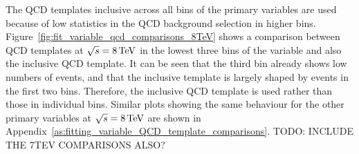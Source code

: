 \FloatBarrier

The QCD templates inclusive across all bins of the primary variables are used because of low statistics in the
QCD background selection in higher bins. Figure~\ref{fig:fit_variable_qcd_comparisons_8TeV} shows a comparison
between QCD templates at $\sqrt{s}=8\,\text{Te\hspace{-.08em}V}$ in the lowest three bins of the \met variable and also the inclusive
\met QCD template. It can be seen that the third \met bin already shows low numbers of events, and that the
inclusive template is largely shaped by events in the first two bins. Therefore, the inclusive QCD template is
used rather than those in individual bins. Similar plots showing the same behaviour for the other primary
variables at $\sqrt{s}=8\,\text{Te\hspace{-.08em}V}$ are shown in Appendix~\ref{as:fitting_variable_QCD_template_comparisons}. TODO:
INCLUDE THE 7TEV COMPARISONS ALSO? %

